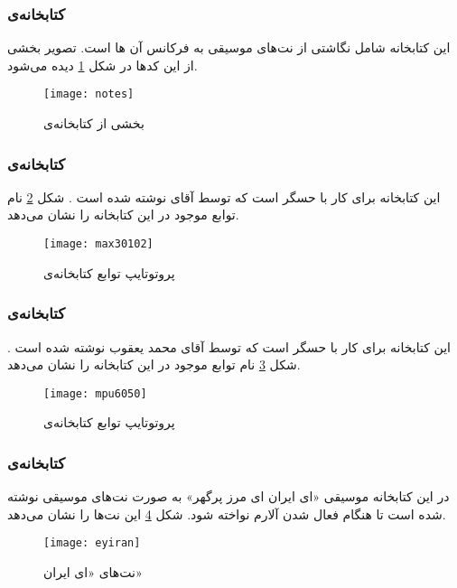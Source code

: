 \newpage
\subsubsection{کتابخانه‌ی }
این کتابخانه شامل نگاشتی از نت‌های موسیقی به فرکانس آن ها است. تصویر بخشی از این کدها در شکل \ref{fig:notes} دیده می‌شود.

\begin{figure}[h]
	\centering
	\texttt{[image: notes]}
	\caption{بخشی از کتابخانه‌ی }
	\label{fig:notes}
\end{figure}

\subsubsection{کتابخانه‌ی }
این کتابخانه برای کار با حسگر  است که توسط آقای  نوشته شده است \cite{max30102}. شکل \ref{fig:max} نام توابع موجود در این کتابخانه را نشان می‌دهد.

\begin{figure}[h]
	\centering
	\texttt{[image: max30102]}
	\caption{پروتوتایپ توابع کتابخانه‌ی }
	\label{fig:max}
\end{figure}

\newpage
\subsubsection{کتابخانه‌ی }
این کتابخانه برای کار با حسگر  است که توسط آقای محمد یعقوب نوشته شده است \cite{mpu6050}. شکل \ref{fig:mpu} نام توابع موجود در این کتابخانه را نشان می‌دهد.

\begin{figure}[h]
	\centering
	\texttt{[image: mpu6050]}
	\caption{پروتوتایپ توابع کتابخانه‌ی }
	\label{fig:mpu}
\end{figure}

\subsubsection{کتابخانه‌ی }
در این کتابخانه موسیقی «ای ایران ای مرز پرگهر» به صورت نت‌های موسیقی نوشته شده است تا هنگام فعال شدن آلارم نواخته شود. شکل \ref{fig:music} این نت‌ها را نشان می‌دهد.

\begin{figure}[h]
	\centering
	\texttt{[image: eyiran]}
	\caption{نت‌های «ای ایران»}
	\label{fig:music}
\end{figure}

